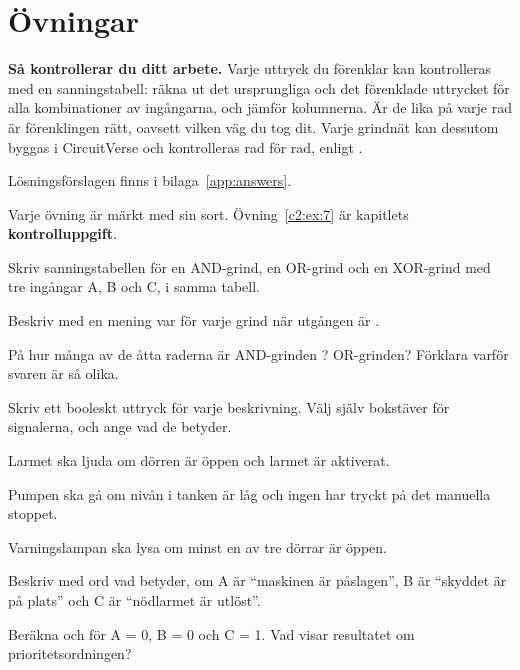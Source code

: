 
\section{Övningar}
\label{c2:sec:exercises}\label{c2:app:c}

\begin{aside}
\textbf{Så kontrollerar du ditt arbete.} Varje uttryck du förenklar kan kontrolleras med en
sanningstabell: räkna ut det ursprungliga och det förenklade uttrycket för alla kombinationer av
ingångarna, och jämför kolumnerna. Är de lika på varje rad är förenklingen rätt, oavsett vilken väg
du tog dit. Varje grindnät kan dessutom byggas i CircuitVerse och kontrolleras rad för rad, enligt
.

Lösningsförslagen finns i bilaga~\ref{app:answers}.

Varje övning är märkt med sin sort. Övning~\ref{c2:ex:7} är kapitlets
\textbf{kontrolluppgift}.
\end{aside}

\label{c2:ex:1}
\begin{parts}
  \item Skriv sanningstabellen för en AND-grind, en OR-grind och en XOR-grind med tre ingångar A,
    B och C, i samma tabell.
  \item Beskriv med en mening var för varje grind när utgången är .
  \item På hur många av de åtta raderna är AND-grinden ? OR-grinden? Förklara varför
    svaren är så olika.
\end{parts}

\label{c2:ex:2}
Skriv ett booleskt uttryck för varje beskrivning. Välj själv bokstäver för signalerna, och ange vad
de betyder.
\begin{parts}
  \item Larmet ska ljuda om dörren är öppen och larmet är aktiverat.
  \item Pumpen ska gå om nivån i tanken är låg och ingen har tryckt på det manuella stoppet.
  \item Varningslampan ska lysa om minst en av tre dörrar är öppen.
  \item Beskriv med ord vad \mbox{} betyder, om A är
    \enquote{maskinen är påslagen}, B är \enquote{skyddet är på plats} och C är
    \enquote{nödlarmet är utlöst}.
  \item Beräkna \mbox{} och \mbox{} för A = 0, B = 0 och C = 1. Vad
    visar resultatet om prioritetsordningen?
\end{parts}

